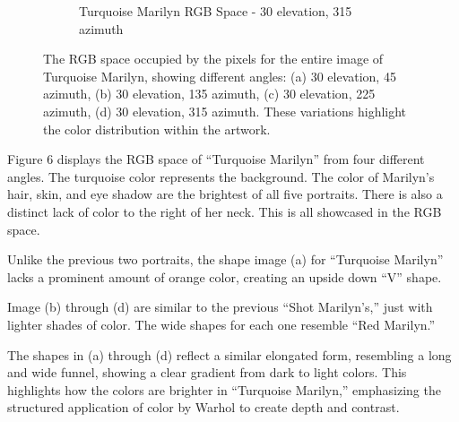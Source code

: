 \documentclass{article}
\begin{document}
\begin{figure}[ht]
\begin{subfigure}{0.45\textwidth}
    \caption{Turquoise Marilyn RGB Space - 30 \degree elevation, 315 \degree azimuth}
    \label{fig:4_12_turq_marilyn_original_scatter}
  \end{subfigure}
  \caption{The RGB space occupied by the pixels for the entire image of Turquoise Marilyn, showing different angles: (a) 30 \degree elevation, 45 \degree azimuth, (b) 30 \degree elevation, 135 \degree azimuth, (c) 30 \degree elevation, 225 \degree azimuth, (d) 30 \degree elevation, 315 \degree azimuth. These variations highlight the color distribution within the artwork.}
  \label{fig:turq_marilyn_original_scatter_2}
\end{figure}

Figure 6 displays the RGB space of ``Turquoise Marilyn'' from four
different angles. The turquoise color represents the background. The
color of Marilyn's hair, skin, and eye shadow are the brightest of all
five portraits. There is also a distinct lack of color to the right of
her neck. This is all showcased in the RGB space.

Unlike the previous two portraits, the shape image (a) for ``Turquoise
Marilyn'' lacks a prominent amount of orange color, creating an upside
down ``V'' shape.

Image (b) through (d) are similar to the previous ``Shot Marilyn's,''
just with lighter shades of color. The wide shapes for each one resemble
``Red Marilyn.''

The shapes in (a) through (d) reflect a similar elongated form,
resembling a long and wide funnel, showing a clear gradient from dark to
light colors. This highlights how the colors are brighter in ``Turquoise
Marilyn,'' emphasizing the structured application of color by Warhol to
create depth and contrast.
\end{document}
